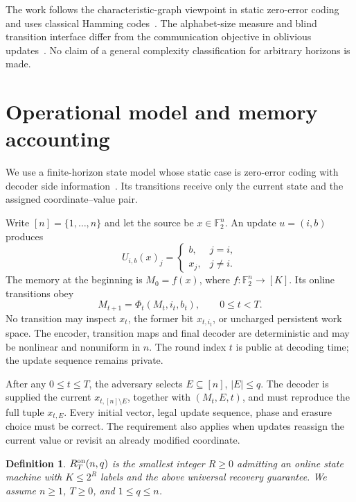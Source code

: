 \documentclass[11pt,a4paper]{article}
\newtheorem{definition}[theorem]{Definition}
\newcommand{\F}{\mathbb F_2}
\begin{document}
The work follows the characteristic-graph viewpoint in static zero-error coding~\cite{witsenhausen1976} and uses classical Hamming codes~\cite{hamming1950,macwilliams1977}. The alphabet-size measure and blind transition interface differ from the communication objective in oblivious updates~\cite{nakkiran2014}. No claim of a general complexity classification for arbitrary horizons is made.


\section{Operational model and memory accounting}
We use a finite-horizon state model whose static case is zero-error coding with decoder side information~\cite{witsenhausen1976}. Its transitions receive only the current state and the assigned coordinate--value pair.

Write $[n]=\{1,\ldots,n\}$ and let the source be $x\in\F^n$. An update $u=(i,b)$ produces
\[
U_{i,b}(x)_j=\begin{cases}b,&j=i,\\x_j,&j\ne i.\end{cases}
\]
The memory at the beginning is $M_0=f(x)$, where $f:\F^n\to[K]$. Its online transitions obey
\begin{equation}\label{eq:transition}
 M_{t+1}=\Phi_t(M_t,i_t,b_t),\qquad 0\le t<T.
\end{equation}
No transition may inspect $x_t$, the former bit $x_{t,i_t}$, or uncharged persistent work space. The encoder, transition maps and final decoder are deterministic and may be nonlinear and nonuniform in $n$. The round index $t$ is public at decoding time; the update sequence remains private.

After any $0\le t\le T$, the adversary selects $E\subseteq[n]$, $|E|\le q$. The decoder is supplied the current $x_{t,[n]\setminus E}$, together with $(M_t,E,t)$, and must reproduce the full tuple $x_{t,E}$. Every initial vector, legal update sequence, phase and erasure choice must be correct. The requirement also applies when updates reassign the current value or revisit an already modified coordinate.

\begin{definition}\label{def:r}
$R_T^{\rm on}(n,q)$ is the smallest integer $R\ge0$ admitting an online state machine with $K\le 2^R$ labels and the above universal recovery guarantee. We assume $n\ge1$, $T\ge0$, and $1\le q\le n$.
\end{definition}
\end{document}
